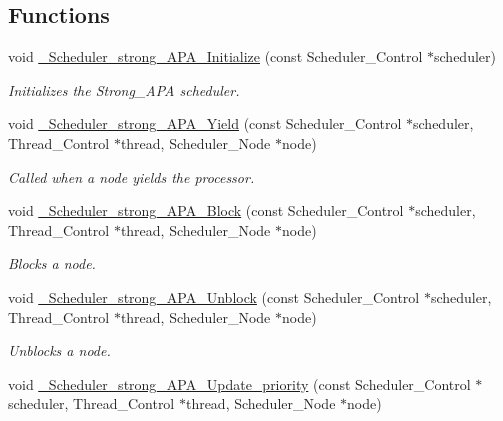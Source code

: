 \subsection*{Functions}
\begin{DoxyCompactItemize}
\item 
void \hyperlink{group__RTEMSScoreSchedulerStrongAPA_gafcd6fde337d7542784698219322b6365}{\+\_\+\+Scheduler\+\_\+strong\+\_\+\+A\+P\+A\+\_\+\+Initialize} (const Scheduler\+\_\+\+Control $\ast$scheduler)
\begin{DoxyCompactList}\small\item\em Initializes the Strong\+\_\+\+A\+PA scheduler. \end{DoxyCompactList}\item 
void \hyperlink{group__RTEMSScoreSchedulerStrongAPA_gad6d1206459f21c74882cd2fb3ddd4aae}{\+\_\+\+Scheduler\+\_\+strong\+\_\+\+A\+P\+A\+\_\+\+Yield} (const Scheduler\+\_\+\+Control $\ast$scheduler, Thread\+\_\+\+Control $\ast$thread, Scheduler\+\_\+\+Node $\ast$node)
\begin{DoxyCompactList}\small\item\em Called when a node yields the processor. \end{DoxyCompactList}\item 
void \hyperlink{group__RTEMSScoreSchedulerStrongAPA_gae7875a7e75f2615c6603155126d437db}{\+\_\+\+Scheduler\+\_\+strong\+\_\+\+A\+P\+A\+\_\+\+Block} (const Scheduler\+\_\+\+Control $\ast$scheduler, Thread\+\_\+\+Control $\ast$thread, Scheduler\+\_\+\+Node $\ast$node)
\begin{DoxyCompactList}\small\item\em Blocks a node. \end{DoxyCompactList}\item 
void \hyperlink{group__RTEMSScoreSchedulerStrongAPA_ga8e6ee051e6a359186fd6964051db69e2}{\+\_\+\+Scheduler\+\_\+strong\+\_\+\+A\+P\+A\+\_\+\+Unblock} (const Scheduler\+\_\+\+Control $\ast$scheduler, Thread\+\_\+\+Control $\ast$thread, Scheduler\+\_\+\+Node $\ast$node)
\begin{DoxyCompactList}\small\item\em Unblocks a node. \end{DoxyCompactList}\item 
void \hyperlink{group__RTEMSScoreSchedulerStrongAPA_gafd1bbcb35f99dd53b4ffe2fe52030cdc}{\+\_\+\+Scheduler\+\_\+strong\+\_\+\+A\+P\+A\+\_\+\+Update\+\_\+priority} (const Scheduler\+\_\+\+Control $\ast$scheduler, Thread\+\_\+\+Control $\ast$thread, Scheduler\+\_\+\+Node $\ast$node)

\end{DoxyCompactItemize}
